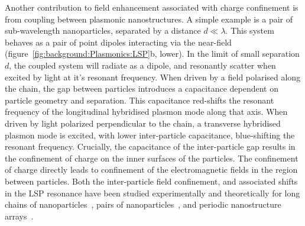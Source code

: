 Another contribution to field enhancement associated with charge confinement is from coupling between plasmonic nanostructures. A simple example is a pair of sub-wavelength nanoparticles, separated by a distance $d \ll \lambda$. This system behaves as a pair of point dipoles interacting via the near-field (figure~\ref{fig:background:Plasmonics:LSP}b, lower). In the limit of small separation $d$, the coupled system will radiate as a dipole, and resonantly scatter when excited by light at it's resonant frequency. When driven by a field polarised along the chain, the gap between particles introduces a capacitance dependent on particle geometry and separation. This capacitance red-shifts the resonant frequency of the longitudinal hybridised plasmon mode along that axis. When driven by light polarized perpendicular to the chain, a transverse hybridised plasmon mode is excited, with lower inter-particle capacitance, blue-shifting the resonant frequency. Crucially, the capacitance of the inter-particle gap results in the confinement of charge on the inner surfaces of the particles. The confinement of charge directly leads to confinement of the electromagnetic fields in the region between particles. Both the inter-particle field confinement, and associated shifts in the LSP resonance have been studied experimentally and theoretically for long chains of nanoparticles~\cite{Krenn1999, Krenn1999a}, pairs of nanoparticles~\cite{Huang2016}, and periodic nanostructure arrays~\cite{Lee2016, Valev2011b, Valev2012a}.

